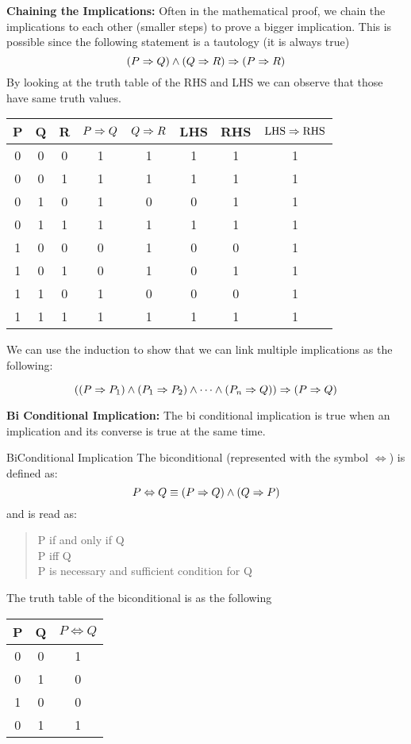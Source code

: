 \textbf{Chaining the Implications:} Often in the mathematical proof, we chain the implications to each other (smaller steps) to prove a bigger implication. This is possible since the following statement is a tautology (it is always true)
\[  (P \Rightarrow Q) \wedge (Q \Rightarrow R) \Rightarrow (P \Rightarrow R)  \]
By looking at the truth table of the RHS and LHS we can observe that those have same truth values.
\begin{center}
	\begin{tabular}{|c|c|c|c|c|c|c|c|}
		\hline
		P & Q & R & $ P \Rightarrow Q $ & $ Q \Rightarrow R $ & LHS & RHS & $ \text{LHS} \Rightarrow \text{RHS} $ \\
		\hline
		0 & 0 & 0 & 1 & 1 & 1 & 1 & 1 \\
		\hline
		0 & 0 & 1 & 1 & 1 & 1 & 1 & 1 \\
		\hline
		0 & 1 & 0 & 1 & 0 & 0 & 1 & 1 \\
		\hline
		0 & 1 & 1 & 1 & 1 & 1 & 1 & 1 \\
		\hline
		1 & 0 & 0 & 0 & 1 & 0 & 0 & 1 \\
		\hline
		1 & 0 & 1 & 0 & 1 & 0 & 1 & 1 \\
		\hline
		1 & 1 & 0 & 1 & 0 & 0 & 0 & 1 \\
		\hline
		1 & 1 & 1 & 1 & 1 & 1 & 1 & 1 \\
		\hline
	\end{tabular}
\end{center} 
We can use the induction to show that we can link multiple implications as the following:

\begin{equation}\label{equ:babyImplicationImplyBigImplicationProof}
	((P \Rightarrow P_1) \wedge (P_1 \Rightarrow P_2) \wedge \cdots \wedge (P_n \Rightarrow Q)) \Rightarrow (P \Rightarrow Q)
\end{equation}

\newpage
\textbf{Bi Conditional Implication:} The bi conditional implication is true when an implication and its converse is true at the same time.

\begin{defbox}{BiConditional Implication}
	The biconditional (represented with the symbol $\Leftrightarrow$) is defined as:
	\[ P \Leftrightarrow Q \equiv (P \Rightarrow Q) \wedge (Q \Rightarrow P) \]
	and is read as:
	\begin{quote}
		P if and only if Q \\
		P iff Q \\
		P is necessary and sufficient condition for Q
	\end{quote}
	The truth table of the biconditional is as the following
	\begin{center}
	\begin{tabular}{|c|c|c|}
		\hline
		P & Q & $ P \Leftrightarrow Q $ \\
		\hline
		0 & 0 & 1 \\
		\hline
		0 & 1 & 0 \\
		\hline
		1 & 0 & 0 \\
		\hline
		0 & 1 & 1 \\
		\hline
	\end{tabular}
	\end{center}
\end{defbox}


